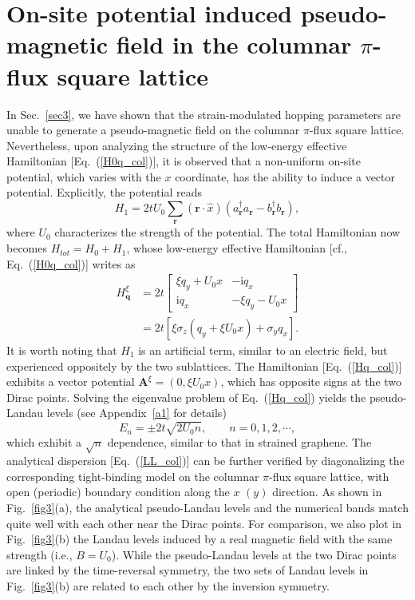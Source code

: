 \documentclass[aps, twocolumn, floatfix, superscriptaddress, prb]{revtex4-1}
\begin{document}
\section{On-site potential induced pseudo-magnetic field in the columnar $\pi$-flux square lattice}
\label{sec4}
In Sec.~\ref{sec3}, we have shown that the strain-modulated hopping parameters are unable to generate a pseudo-magnetic field on the columnar $\pi$-flux square lattice. Nevertheless, upon analyzing the structure of the low-energy effective Hamiltonian [Eq.~(\ref{H0q_col})], it is observed that a non-uniform on-site potential, which varies with the $x$ coordinate, has the ability to induce a vector potential. Explicitly, the  potential reads
%
\begin{equation}\label{pot}
{
H_1=2tU_0\sum_{\bm r} (\bm r \cdot \hat x) (a_{\bm r}^\dagger a_{\bm r} - b_{\bm r}^\dagger b_{\bm r})},
\end{equation}
%
where $U_0$ characterizes the strength of the potential. The total Hamiltonian now becomes $H_{tot}=H_0+H_1$, whose low-energy effective Hamiltonian [cf., Eq.~(\ref{H0q_col})] writes as
%
\begin{equation}\label{Hq_col}
\begin{split}
H_{\bm q}^\xi&=2t \begin{bmatrix}
\xi q_y+U_0x  & -{\textrm{i}}q_x
\\
{\textrm{i}}q_x  & -\xi q_y-U_0x
\end{bmatrix}
\\
&=2t\left[\xi\sigma_z (q_y+\xi U_0x)+\sigma_y q_x\right].
\end{split}
\end{equation}
%
It is worth noting that $H_1$ is an artificial term, similar to an electric field, but experienced oppositely by the two sublattices. The Hamiltonian [Eq.~(\ref{Hq_col})] exhibits a vector potential $\bm A^{\xi}=(0, \xi U_0x)$, which has opposite signs at the two Dirac points. Solving the eigenvalue problem of Eq.~(\ref{Hq_col}) yields the pseudo-Landau levels (see Appendix~\ref{a1} for details)
%
\begin{equation}\label{LL_col}
E_n=\pm2t\sqrt{2U_0n},\qquad n=0,1,2,\cdots,
\end{equation}
%
which exhibit a $\sqrt n$ dependence, similar to that in strained graphene. The analytical dispersion [Eq.~(\ref{LL_col})] can be further verified by diagonalizing the corresponding tight-binding model on the columnar $\pi$-flux square lattice, with open (periodic) boundary condition along the $x$ $(y)$ direction. As shown in Fig.~\ref{fig3}(a), the analytical pseudo-Landau levels and the numerical bands match quite well with each other near the Dirac points. For comparison, we also plot in Fig.~\ref{fig3}(b) the Landau levels induced by a real magnetic field with the same strength (i.e., $B=U_0$). While the pseudo-Landau levels at the two Dirac points are linked by the time-reversal symmetry, the two sets of Landau levels in Fig.~\ref{fig3}(b) are related to each other by the inversion symmetry.
\end{document}
